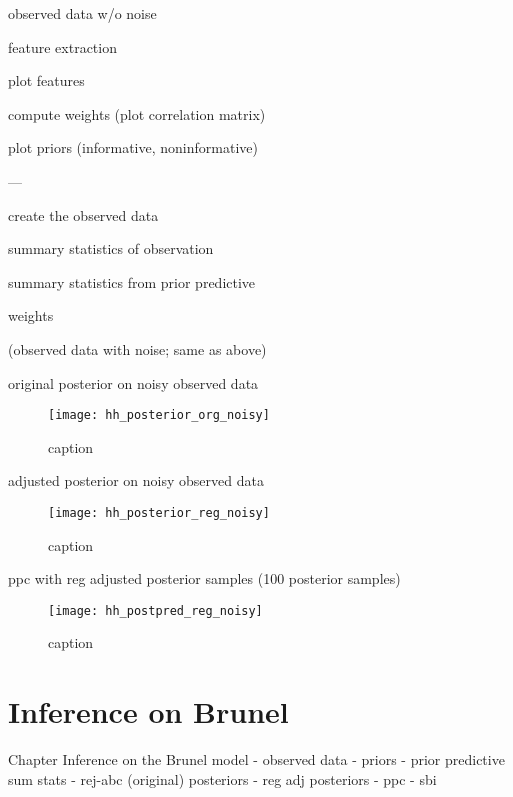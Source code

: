 observed data w/o noise 

feature extraction 

plot features 

compute weights (plot correlation matrix) 

plot priors (informative, noninformative)


---

create the observed data

summary statistics of observation 

summary statistics from prior predictive

weights

(observed data with noise; same as above)


original posterior on noisy observed data

\begin{figure}[H]
    \centering
    \texttt{[image: hh\_posterior\_org\_noisy]}
    \caption{caption}
    \label{fig:fig1}
\end{figure} 

adjusted posterior on noisy observed data

\begin{figure}[H]
    \centering
    \texttt{[image: hh\_posterior\_reg\_noisy]}
    \caption{caption}
    \label{fig:fig1}
\end{figure} 

ppc with reg adjusted posterior samples (100 posterior samples)


\begin{figure}[H]
    \centering
    \texttt{[image: hh\_postpred\_reg\_noisy]}
    \caption{caption}
    \label{fig:fig1}
\end{figure}
\chapter{Inference on Brunel}\label{chap:res_brunel}

Chapter Inference on the Brunel model
- observed data 
- priors
- prior predictive sum stats 
- rej-abc (original) posteriors 
- reg adj posteriors
- ppc 
- sbi



